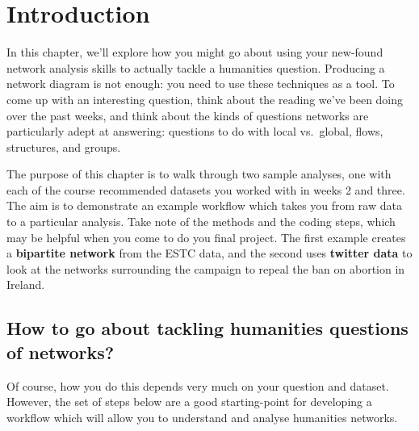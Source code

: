 \documentclass[
]{book}
\begin{document}
\hypertarget{introduction-4}{%
\section{Introduction}\label{introduction-4}}

In this chapter, we'll explore how you might go about using your new-found network analysis skills to actually tackle a humanities question. Producing a network diagram is not enough: you need to use these techniques as a tool. To come up with an interesting question, think about the reading we've been doing over the past weeks, and think about the kinds of questions networks are particularly adept at answering: questions to do with local vs.~global, flows, structures, and groups.

The purpose of this chapter is to walk through two sample analyses, one with each of the course recommended datasets you worked with in weeks 2 and three. The aim is to demonstrate an example workflow which takes you from raw data to a particular analysis. Take note of the methods and the coding steps, which may be helpful when you come to do you final project. The first example creates a \textbf{bipartite network} from the ESTC data, and the second uses \textbf{twitter data} to look at the networks surrounding the campaign to repeal the ban on abortion in Ireland.

\hypertarget{how-to-go-about-tackling-humanities-questions-of-networks}{%
\subsection{How to go about tackling humanities questions of networks?}\label{how-to-go-about-tackling-humanities-questions-of-networks}}

Of course, how you do this depends very much on your question and dataset. However, the set of steps below are a good starting-point for developing a workflow which will allow you to understand and analyse humanities networks.
\end{document}
